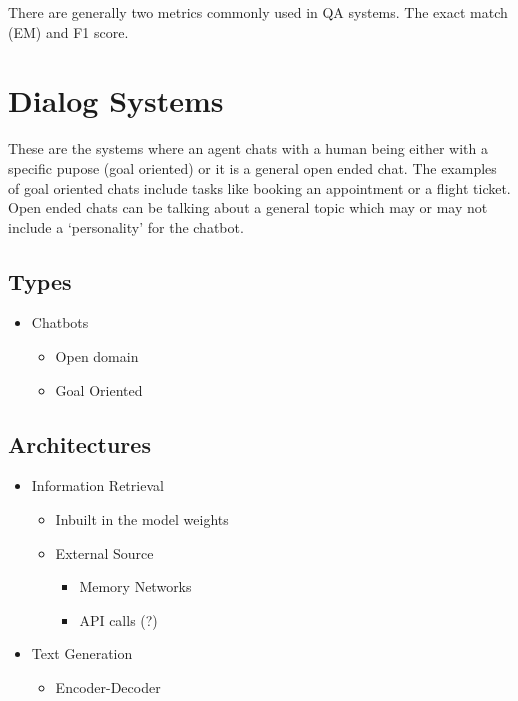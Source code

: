 \documentclass[]{krantz}
\providecommand{\tightlist}{%
  \setlength{\itemsep}{0pt}\setlength{\parskip}{0pt}}
\begin{document}
There are generally two metrics commonly used in QA systems. The exact match (EM) and F1 score.

\hypertarget{dialog-systems}{%
\chapter{Dialog Systems}\label{dialog-systems}}

These are the systems where an agent chats with a human being either with a specific pupose (goal oriented) or it is a general open ended chat. The examples of goal oriented chats include tasks like booking an appointment or a flight ticket. Open ended chats can be talking about a general topic which may or may not include a `personality' for the chatbot.

\hypertarget{types-1}{%
\section{Types}\label{types-1}}

\begin{itemize}
\tightlist
\item
  Chatbots

  \begin{itemize}
  \tightlist
  \item
    Open domain
  \item
    Goal Oriented
  \end{itemize}
\end{itemize}

\hypertarget{architectures-1}{%
\section{Architectures}\label{architectures-1}}

\begin{itemize}
\tightlist
\item
  Information Retrieval

  \begin{itemize}
  \tightlist
  \item
    Inbuilt in the model weights
  \item
    External Source

    \begin{itemize}
    \tightlist
    \item
      Memory Networks
    \item
      API calls (?)
    \end{itemize}
  \end{itemize}
\item
  Text Generation

  \begin{itemize}
  \tightlist
  \item
    Encoder-Decoder
  \end{itemize}
\end{itemize}
\end{document}
